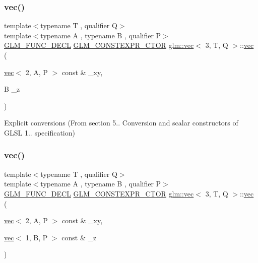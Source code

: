 \mbox{\label{structglm_1_1vec_3_013_00_01_t_00_01_q_01_4_a7c657ca44f6029476baa5ad38c8e6220}} 
\subsubsection{\texorpdfstring{vec()}{vec()}\hspace{0.1cm}{\footnotesize\ttfamily [8/23]}}
{\footnotesize\ttfamily template$<$typename T , qualifier Q$>$ \\
template$<$typename A , typename B , qualifier P$>$ \\
\mbox{\hyperlink{setup_8hpp_ab2d052de21a70539923e9bcbf6e83a51}{G\+L\+M\+\_\+\+F\+U\+N\+C\+\_\+\+D\+E\+CL}} \mbox{\hyperlink{setup_8hpp_ad34178a09666081abdb573c14d1f4a5a}{G\+L\+M\+\_\+\+C\+O\+N\+S\+T\+E\+X\+P\+R\+\_\+\+C\+T\+OR}} \mbox{\hyperlink{structglm_1_1vec}{glm\+::vec}}$<$ 3, T, Q $>$\+::\mbox{\hyperlink{structglm_1_1vec}{vec}} (\begin{DoxyParamCaption}\item[{\mbox{\hyperlink{structglm_1_1vec}{vec}}$<$ 2, A, P $>$ const \&}]{\+\_\+xy,  }\item[{B}]{\+\_\+z }\end{DoxyParamCaption})}



Explicit conversions (From section 5.. Conversion and scalar constructors of G\+L\+SL 1.. specification) 

\mbox{\label{structglm_1_1vec_3_013_00_01_t_00_01_q_01_4_a800af9ada84dfb76714e279e81eb266e}} 
\subsubsection{\texorpdfstring{vec()}{vec()}\hspace{0.1cm}{\footnotesize\ttfamily [9/23]}}
{\footnotesize\ttfamily template$<$typename T , qualifier Q$>$ \\
template$<$typename A , typename B , qualifier P$>$ \\
\mbox{\hyperlink{setup_8hpp_ab2d052de21a70539923e9bcbf6e83a51}{G\+L\+M\+\_\+\+F\+U\+N\+C\+\_\+\+D\+E\+CL}} \mbox{\hyperlink{setup_8hpp_ad34178a09666081abdb573c14d1f4a5a}{G\+L\+M\+\_\+\+C\+O\+N\+S\+T\+E\+X\+P\+R\+\_\+\+C\+T\+OR}} \mbox{\hyperlink{structglm_1_1vec}{glm\+::vec}}$<$ 3, T, Q $>$\+::\mbox{\hyperlink{structglm_1_1vec}{vec}} (\begin{DoxyParamCaption}\item[{\mbox{\hyperlink{structglm_1_1vec}{vec}}$<$ 2, A, P $>$ const \&}]{\+\_\+xy,  }\item[{\mbox{\hyperlink{structglm_1_1vec}{vec}}$<$ 1, B, P $>$ const \&}]{\+\_\+z }\end{DoxyParamCaption})}



